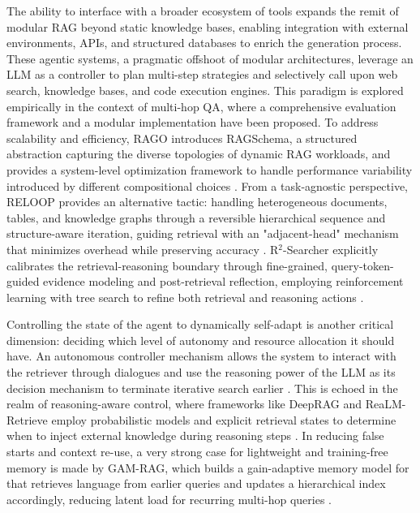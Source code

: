 \documentclass[11pt,a4paper]{article}
\begin{document}
The ability to interface with a broader ecosystem of tools expands the remit of modular RAG beyond static knowledge bases, enabling integration with external environments, APIs, and structured databases to enrich the generation process. These agentic systems, a pragmatic offshoot of modular architectures, leverage an LLM as a controller to plan multi-step strategies and selectively call upon web search, knowledge bases, and code execution engines. This paradigm is explored empirically in the context of multi-hop QA, where a comprehensive evaluation framework \cite{arxiv:2408.04259v1} and a modular implementation \cite{arxiv:2509.09713v1} have been proposed. To address scalability and efficiency, RAGO introduces RAGSchema, a structured abstraction capturing the diverse topologies of dynamic RAG workloads, and provides a system-level optimization framework to handle performance variability introduced by different compositional choices \cite{arxiv:2503.14649v2}. From a task-agnostic perspective, RELOOP provides an alternative tactic: handling heterogeneous documents, tables, and knowledge graphs through a reversible hierarchical sequence and structure-aware iteration, guiding retrieval with an "adjacent-head" mechanism that minimizes overhead while preserving accuracy \cite{arxiv:2510.20505v4}. R$^{2}$-Searcher explicitly calibrates the retrieval-reasoning boundary through fine-grained, query-token-guided evidence modeling and post-retrieval reflection, employing reinforcement learning with tree search to refine both retrieval and reasoning actions \cite{arxiv:2606.28566v1}.

Controlling the state of the agent to dynamically self-adapt is another critical dimension: deciding which level of autonomy and resource allocation it should have. An autonomous controller mechanism allows the system to interact with the retriever through dialogues and use the reasoning power of the LLM as its decision mechanism to terminate iterative search earlier \cite{arxiv:2411.19443v1}. This is echoed in the realm of reasoning-aware control, where frameworks like DeepRAG and ReaLM-Retrieve employ probabilistic models and explicit retrieval states to determine when to inject external knowledge during reasoning steps \cite{arxiv:2502.01142v2,arxiv:2601.04618v2}. In reducing false starts and context re-use, a very strong case for lightweight and training-free memory is made by GAM-RAG, which builds a gain-adaptive memory model for that retrieves language from earlier queries and updates a hierarchical index accordingly, reducing latent load for recurring multi-hop queries \cite{arxiv:2401.14887v3}.
\end{document}
